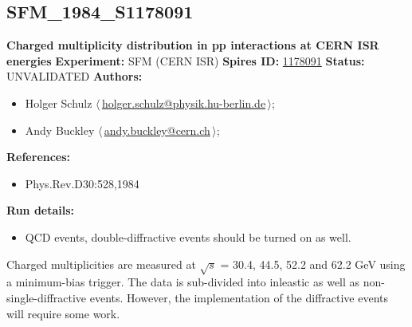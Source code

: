 \subsection[SFM\_1984\_S1178091]{SFM\_1984\_S1178091\,\cite{Breakstone:1983ns}}
\textbf{Charged multiplicity distribution in pp interactions at CERN ISR energies}\newline
\textbf{Experiment:} SFM (CERN ISR) \newline
\textbf{Spires ID:} \href{http://www.slac.stanford.edu/spires/find/hep/www?rawcmd=key+1178091}{1178091}\newline
\textbf{Status:} UNVALIDATED\newline
\textbf{Authors:}
\begin{itemize}
  \item Holger Schulz $\langle\,$\href{mailto:holger.schulz@physik.hu-berlin.de}{holger.schulz@physik.hu-berlin.de}$\,\rangle$;
  \item Andy Buckley $\langle\,$\href{mailto:andy.buckley@cern.ch}{andy.buckley@cern.ch}$\,\rangle$;
\end{itemize}
\textbf{References:}
\begin{itemize}
  \item Phys.Rev.D30:528,1984
\end{itemize}
\textbf{Run details:}
\begin{itemize}

  \item QCD events, double-diffractive events should be turned on as well.\end{itemize}

\noindent Charged multiplicities are measured at \ensuremath{\sqrt{s}} = 30.4, 44.5, 52.2  and 62.2 GeV using a minimum-bias trigger. The data is sub-divided  into inleastic as well as non-single-diffractive events. However,  the implementation of the diffractive events will require some work.

\clearpage


